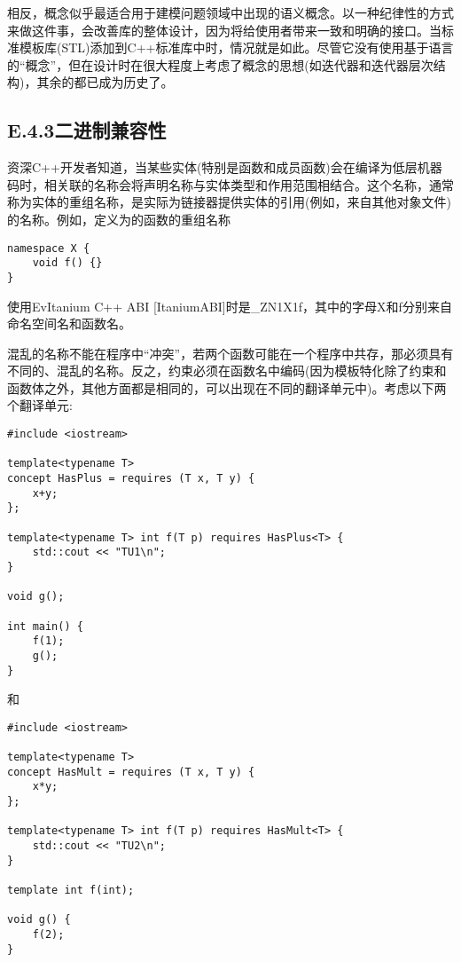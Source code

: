 相反，概念似乎最适合用于建模问题领域中出现的语义概念。以一种纪律性的方式来做这件事，会改善库的整体设计，因为将给使用者带来一致和明确的接口。当标准模板库(STL)添加到C++标准库中时，情况就是如此。尽管它没有使用基于语言的“概念”，但在设计时在很大程度上考虑了概念的思想(如迭代器和迭代器层次结构)，其余的都已成为历史了。

\subsection{E.4.3\hspace{0.2cm}二进制兼容性}

资深C++开发者知道，当某些实体(特别是函数和成员函数)会在编译为低层机器码时，相关联的名称会将声明名称与实体类型和作用范围相结合。这个名称，通常称为实体的重组名称，是实际为链接器提供实体的引用(例如，来自其他对象文件)的名称。例如，定义为的函数的重组名称

\begin{lstlisting}[style=styleCXX]
namespace X {
	void f() {}
}
\end{lstlisting}

使用EvItanium C++ ABI [ItaniumABI]时是\_ZN1X1f，其中的字母X和f分别来自命名空间名和函数名。

混乱的名称不能在程序中“冲突”，若两个函数可能在一个程序中共存，那必须具有不同的、混乱的名称。反之，约束必须在函数名中编码(因为模板特化除了约束和函数体之外，其他方面都是相同的，可以出现在不同的翻译单元中)。考虑以下两个翻译单元:

\begin{lstlisting}[style=styleCXX]
#include <iostream>

template<typename T>
concept HasPlus = requires (T x, T y) {
	x+y;
};

template<typename T> int f(T p) requires HasPlus<T> {
	std::cout << "TU1\n";
}

void g();

int main() {
	f(1);
	g();
}
\end{lstlisting}

和

\begin{lstlisting}[style=styleCXX]
#include <iostream>

template<typename T>
concept HasMult = requires (T x, T y) {
	x*y;
};

template<typename T> int f(T p) requires HasMult<T> {
	std::cout << "TU2\n";
}

template int f(int);

void g() {
	f(2);
}
\end{lstlisting}

